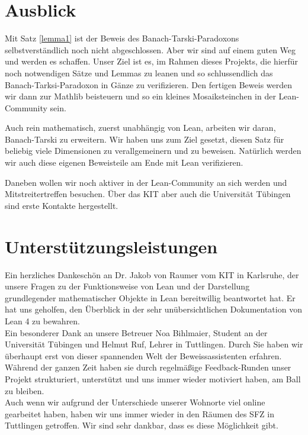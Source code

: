 \documentclass[10pt]{article}
\begin{document}
\section{Ausblick}
Mit Satz \ref{lemma1} ist der Beweis des Banach-Tarski-Paradoxons selbstverständlich noch nicht abgeschlossen. Aber wir sind auf einem guten Weg und werden es schaffen. Unser Ziel ist es, im Rahmen dieses Projekts, die hierfür noch notwendigen Sätze und Lemmas zu leanen und so schlussendlich das Banach-Tarksi-Paradoxon in Gänze zu verifizieren. Den fertigen Beweis werden wir dann zur Mathlib beisteuern und so ein kleines Mosaiksteinchen in der Lean-Community sein. 

\noindent Auch rein mathematisch, zuerst unabhängig von Lean, arbeiten wir daran, Banach-Tarski zu erweitern. Wir haben uns zum Ziel gesetzt, diesen Satz für beliebig viele Dimensionen zu verallgemeinern und zu beweisen. Natürlich werden wir auch diese eigenen Beweisteile am Ende mit Lean verifizieren.

\noindent Daneben wollen wir noch aktiver in der Lean-Community an sich werden und Mitstreitertreffen besuchen. Über das KIT aber auch die Universität Tübingen sind erste Kontakte hergestellt.    

\newpage
\section{Unterstützungsleistungen}
Ein herzliches Dankeschön an Dr. Jakob von Raumer vom KIT in Karlsruhe, der unsere Fragen zu der Funktionsweise von Lean und der Darstellung grundlegender mathematischer Objekte in Lean bereitwillig beantwortet hat. Er hat uns geholfen, den Überblick in der sehr unübersichtlichen Dokumentation von Lean 4 zu bewahren. \\

\noindent Ein besonderer Dank an unsere Betreuer Noa Bihlmaier, Student an der Universität Tübingen und Helmut Ruf, Lehrer in Tuttlingen. Durch Sie haben wir überhaupt erst von dieser spannenden Welt der Beweissassistenten erfahren. Während der ganzen Zeit haben sie durch regelmäßige Feedback-Runden unser Projekt strukturiert, unterstützt und uns immer wieder motiviert haben, am Ball zu bleiben. \\

\noindent Auch wenn wir aufgrund der Unterschiede unserer Wohnorte viel online gearbeitet haben, haben wir uns immer wieder in den Räumen des SFZ in Tuttlingen getroffen. Wir sind sehr dankbar, dass es diese Möglichkeit gibt. 
\end{document}
